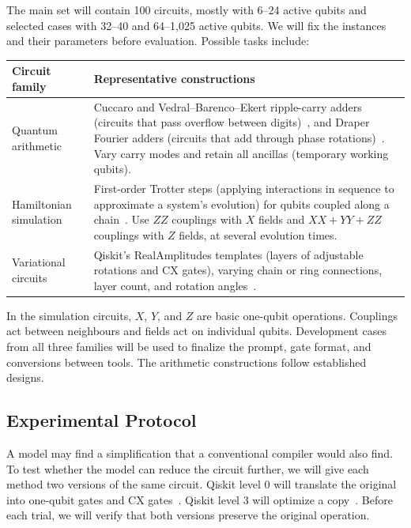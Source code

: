 \documentclass[12pt]{article}
\begin{document}
The main set will contain 100 circuits, mostly with 6--24 active qubits and selected cases with
32--40 and 64--1,025 active qubits. We will fix the instances and
their parameters before evaluation. Possible tasks include:

\par\smallskip
\begingroup\small
\noindent
\begin{tabularx}{\textwidth}{@{}
  >{\raggedright\arraybackslash}p{}
  >{\raggedright\arraybackslash}X
  @{}}
  \toprule
  \textbf{Circuit family} & \textbf{Representative constructions} \\
  \midrule
  Quantum arithmetic &
    Cuccaro and Vedral--Barenco--Ekert ripple-carry adders (circuits that pass overflow between
    digits)~\cite{cuccaro,vbe}, and Draper Fourier adders (circuits that add through phase rotations)~\cite{draper}. Vary carry modes
    and retain all ancillas (temporary working qubits). \\
  \addlinespace[2pt]
  Hamiltonian simulation &
    First-order Trotter steps (applying interactions in sequence to approximate a system's
    evolution) for qubits coupled along a chain~\cite{childs-trotter}. Use $ZZ$ couplings with $X$ fields and $XX+YY+ZZ$
    couplings with $Z$ fields, at several evolution times. \\
  \addlinespace[2pt]
  Variational circuits &
    Qiskit's RealAmplitudes templates (layers of adjustable rotations and CX gates), varying chain
    or ring connections, layer count, and rotation angles~\cite{qiskit-code}. \\
  \bottomrule
\end{tabularx}
\par\endgroup\smallskip

In the simulation circuits, $X$, $Y$, and $Z$ are basic one-qubit operations. Couplings act between
neighbours and fields act on individual qubits. Development cases from all three families will be
used to finalize the prompt, gate format, and conversions between tools. The arithmetic
constructions follow established designs.

\subsection{Experimental Protocol}

A model may find a simplification that a conventional compiler would also find. To test whether the model can reduce the circuit further, we will give each method two versions of the same circuit. Qiskit level 0 will translate the original into one-qubit gates and CX gates~\cite{qiskit-code}. Qiskit level 3 will optimize a copy~\cite{zilk}. Before each trial, we will verify that both versions preserve the original operation.
\end{document}
